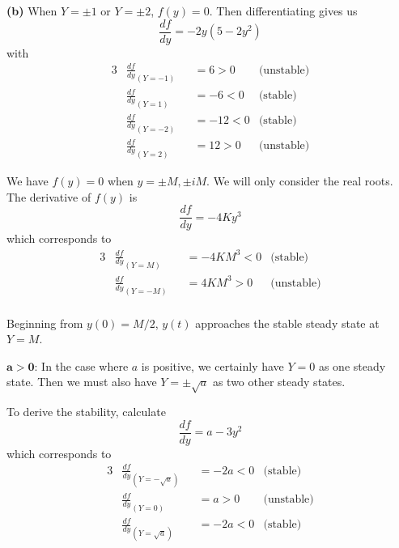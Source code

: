 \documentclass[a4paper]{article}
\begin{document}
\textbf{(b)} When \(Y = \pm 1\) or \(Y = \pm 2\), \(f \!\left( y \right) = 0\). Then differentiating gives us
\[
	\frac{d f}{d y} = -2y \!\left( 5 - 2y^{2} \right)
\]
with
\begin{alignat*}{3}
	&\frac{d f}{d y}_{\!\left( Y = -1 \right) } && = 6 > 0 & \text{(unstable)}  \\
	&\frac{d f}{d y}_{\!\left( Y = 1 \right) } && = - 6 < 0 & \text{(stable)} \\ 
	&\frac{d f}{d y}_{\!\left( Y = -2 \right) } && = -12 < 0 & \text{(stable)} \\
	&\frac{d f}{d y}_{\!\left( Y = 2 \right) } && = 12 > 0 & \text{(unstable)}
\end{alignat*}


We have \(f \!\left( y \right) = 0\) when \(y = \pm M, \pm iM\). We will only consider the real roots. The derivative of \(f \!\left( y \right) \) is
\[
	\frac{d f}{d y} = -4Ky^{3}
\]
which corresponds to
\begin{alignat*}{3}
	&\frac{d f}{d y}_{\!\left( Y = M \right) } && = -4KM^{3} < 0 & \text{(stable)} \\
	&\frac{d f}{d y}_{\!\left( Y = -M \right) } && = 4KM^{3} > 0 & \text{(unstable)} \\ 
\end{alignat*}

Beginning from \(y \!\left( 0 \right) = M/2\), \(y \!\left( t \right) \) approaches the stable steady state at \(Y = M\).

\vspace{12pt}


\(\bm{a > 0}\): In the case where \(a\) is positive, we certainly have \(Y = 0\) as one steady state. Then we must also have \(Y = \pm \sqrt{a}\) as two other steady states. 

To derive the stability, calculate
\[
	\frac{d f}{d y} = a - 3y^{2}
\]
which corresponds to
\begin{alignat*}{3}
	&\frac{d f}{d y}_{\!\left( Y = -\sqrt{a} \right) } && = -2a < 0 & \text{(stable)} \\
	&\frac{d f}{d y}_{\!\left( Y = 0 \right) } && = a > 0 & \text{(unstable)} \\
	&\frac{d f}{d y}_{\!\left( Y = \sqrt{a} \right) } && = -2a < 0 & \text{(stable)}
\end{alignat*}
\end{document}
